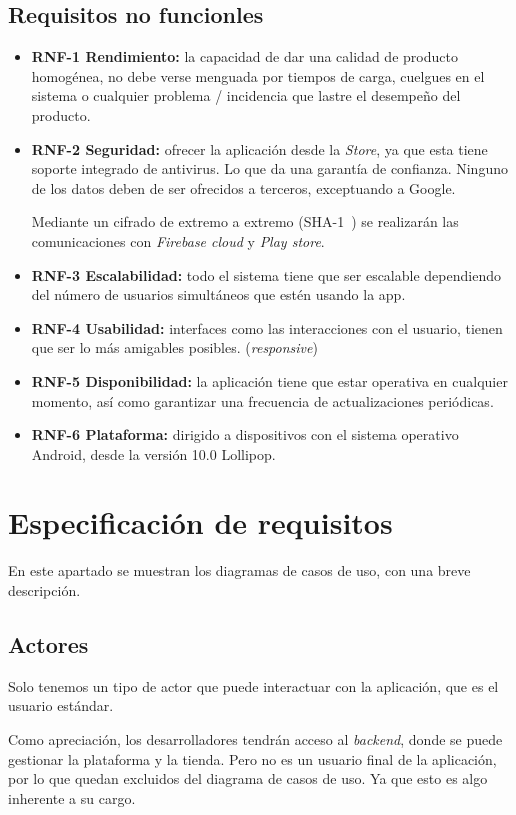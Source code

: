 \subsection{Requisitos no funcionles}
\begin{itemize}
	\tightlist
	\item \textbf{RNF-1 Rendimiento:} la capacidad de dar una calidad de producto homogénea, no debe verse menguada por tiempos de carga, cuelgues en el sistema o cualquier problema / incidencia que lastre el desempeño del producto.
	\item \textbf{RNF-2 Seguridad:} ofrecer la aplicación desde la \emph{Store}, ya que esta tiene soporte integrado de antivirus. Lo que da una garantía de confianza. Ninguno de los datos deben de ser ofrecidos a terceros, exceptuando a Google. 
	
	Mediante un cifrado de extremo a extremo (SHA-1~\cite{wiki:sha1}) se realizarán las comunicaciones con \emph{Firebase cloud} y \emph{Play store}.
	
	\item \textbf{RNF-3 Escalabilidad:} todo el sistema tiene que ser escalable dependiendo del número de usuarios simultáneos que estén usando la app.
	\item \textbf{RNF-4 Usabilidad:} interfaces como las interacciones con el usuario, tienen que ser lo más amigables posibles. (\emph{responsive})
	\item \textbf{RNF-5 Disponibilidad:} la aplicación tiene que estar operativa en cualquier momento, así como garantizar una frecuencia de actualizaciones periódicas.
	\item \textbf{RNF-6 Plataforma:} dirigido a dispositivos con el sistema operativo Android, desde la versión 10.0 Lollipop.
\end{itemize}

\section{Especificación de requisitos}
En este apartado se muestran los diagramas de casos de uso, con una breve descripción.

\subsection{Actores}
Solo tenemos un tipo de actor que puede interactuar con la aplicación, que es el usuario estándar.

Como apreciación, los desarrolladores tendrán acceso al \emph{backend}, donde se puede gestionar la plataforma y la tienda. Pero no es un usuario final de la aplicación, por lo que quedan excluidos del diagrama de casos de uso. Ya que esto es algo inherente a su cargo.

